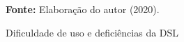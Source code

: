 \begin{figure}[ht!]
\centering

\caption{\textmd{Dificuldade de uso e deficiências da DSL}}
\label{fig:dificuldadegeral}

\par\medskip\textbf{Fonte:} Elaboração do autor (2020). \par\medskip

\end{figure}

